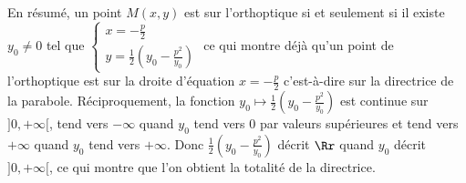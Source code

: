 {{En résumé, un point $M(x,y)$  est sur l'orthoptique si et seulement si il existe $y_0\neq0$ tel que  
$\left\{
\begin{array}{l}
x=-\frac{p}{2}\\
y=\frac{1}{2}\left(y_0-\frac{p^2}{y_0}\right)
\end{array}
\right.$ ce qui montre déjà qu'un point de l'orthoptique est sur la droite d'équation $x = -\frac{p}{2}$  c'est-à-dire sur la directrice de la parabole. Réciproquement, la fonction $y_0\mapsto\frac{1}{2}\left(y_0-\frac{p^2}{y_0}\right)$ est continue sur $]0,+\infty[$, tend vers $-\infty$ quand $y_0$ tend vers $0$ par valeurs supérieures et tend vers $+\infty$ quand $y_0$ tend vers $+\infty$. Donc   $\frac{1}{2}\left(y_0-\frac{p^2}{y_0}\right)$ décrit $\Rr$ quand $y_0$ décrit $]0,+\infty[$, ce qui montre que l'on obtient la totalité de la directrice.}
}